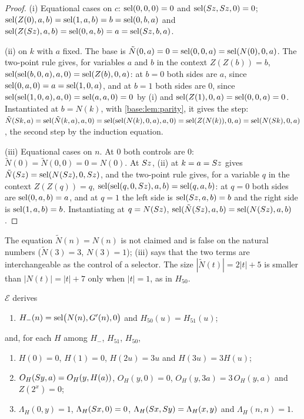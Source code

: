\begin{proof}
(i) Equational cases on $c$: $\operatorname{sel}(0,0,0)=0$ and $\operatorname{sel}(S z,S z,0)=0$;
$\operatorname{sel}(Z(0),a,b)=\operatorname{sel}(1,a,b)=b=\operatorname{sel}(0,b,a)$ and
$\operatorname{sel}(Z(S z),a,b)=\operatorname{sel}(0,a,b)=a=\operatorname{sel}(S z,b,a)$.

(ii)  on $k$ with $a$ fixed.  The base is
$\tilde N(0,a)=0=\operatorname{sel}(0,0,a)=\operatorname{sel}(N(0),0,a)$.  The two-point rule gives, for
variables $a$ and $b$ in the context $Z(Z(b))=b$,
$\operatorname{sel}(\operatorname{sel}(b,0,a),a,0)=\operatorname{sel}(Z(b),0,a)$: at $b=0$ both sides are $a$, since
$\operatorname{sel}(0,a,0)=a=\operatorname{sel}(1,0,a)$, and at $b=1$ both sides are $0$, since
$\operatorname{sel}(\operatorname{sel}(1,0,a),a,0)=\operatorname{sel}(a,a,0)=0$ by (i) and $\operatorname{sel}(Z(1),0,a)=\operatorname{sel}(0,0,a)=0$.
Instantiated at $b=N(k)$, with \cref{base:lem:parity}, it gives the step:
$\tilde N(S k,a)=\operatorname{sel}(\tilde N(k,a),a,0)=\operatorname{sel}(\operatorname{sel}(N(k),0,a),a,0)
 =\operatorname{sel}(Z(N(k)),0,a)=\operatorname{sel}(N(S k),0,a)$, the second step by the induction
equation.

(iii) Equational cases on $n$.  At $0$ both controls are $0$:
$\tilde N(0)=\tilde N(0,0)=0=N(0)$.  At $S z$, (ii) at $k=a=S z$ gives
$\tilde N(S z)=\operatorname{sel}(N(S z),0,S z)$, and the two-point rule gives,
for a variable $q$ in the context $Z(Z(q))=q$,
$\operatorname{sel}(\operatorname{sel}(q,0,S z),a,b)=\operatorname{sel}(q,a,b)$: at $q=0$ both sides are
$\operatorname{sel}(0,a,b)=a$, and at $q=1$ the left side is $\operatorname{sel}(S z,a,b)=b$ and the
right side is $\operatorname{sel}(1,a,b)=b$.  Instantiating at $q=N(S z)$,
$\operatorname{sel}(\tilde N(S z),a,b)=\operatorname{sel}(N(S z),a,b)$.
\end{proof}

The equation $\tilde N(n)=N(n)$ is not claimed and is false on the natural
numbers ($\tilde N(3)=3$, $N(3)=1$); (iii) says that the two terms are
interchangeable as the control of a selector.  The size
$|\tilde N(t)|=2|t|+5$ is smaller than $|N(t)|=|t|+7$ only when $|t|=1$, as
in $H_{50}$.

\begin{lemma}
\label{base:lem:factor57}
$\mathcal E$ derives
\begin{enumerate}[label=\textup{(\roman*)}]
\item $H_-(n)=\operatorname{sel}\bigl(N(n),G'(n),0\bigr)$ and $H_{50}(u)=H_{51}(u)$;
\end{enumerate}
and, for each $H$ among $H_-$, $H_{51}$, $H_{50}$,
\begin{enumerate}[label=\textup{(\roman*)},resume]
\item $H(0)=0$, $H(1)=0$, $H(2u)=3u$ and $H(3u)=3H(u)$;
\item $O_H(S y,a)=O_H(y,H(a))$, $O_H(y,0)=0$, $O_H(y,3a)=3\,O_H(y,a)$ and
 $Z(2^{x})=0$;
\item $\Lambda_H(0,y)=1$, $\Lambda_H(S x,0)=0$,
 $\Lambda_H(S x,S y)=\Lambda_H(x,y)$ and $\Lambda_H(n,n)=1$.
\end{enumerate}
\end{lemma}

